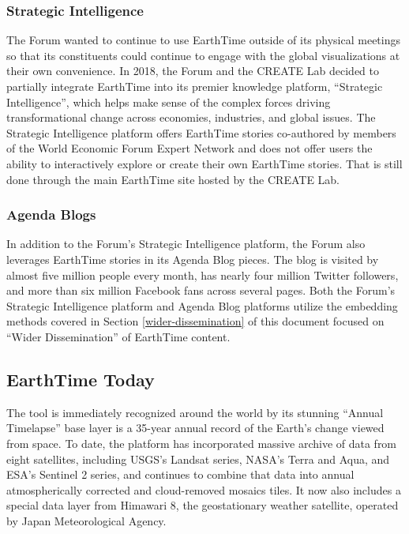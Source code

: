 \documentclass[
  12pt,
]{krantz}
\begin{document}
\hypertarget{strategic-intelligence}{%
\subsubsection*{Strategic Intelligence}\label{strategic-intelligence}}


The Forum wanted to continue to use EarthTime outside of its physical meetings so that its constituents could continue to engage with the global visualizations at their own convenience. In 2018, the Forum and the CREATE Lab decided to partially integrate EarthTime into its premier knowledge platform, ``Strategic Intelligence'', which helps make sense of the complex forces driving transformational change across economies, industries, and global issues. The Strategic Intelligence platform offers EarthTime stories co-authored by members of the World Economic Forum Expert Network and does not offer users the ability to interactively explore or create their own EarthTime stories. That is still done through the main EarthTime site hosted by the CREATE Lab.

\hypertarget{agenda-blogs}{%
\subsubsection*{Agenda Blogs}\label{agenda-blogs}}


In addition to the Forum's Strategic Intelligence platform, the Forum also leverages EarthTime stories in its Agenda Blog pieces. The blog is visited by almost five million people every month, has nearly four million Twitter followers, and more than six million Facebook fans across several pages. Both the Forum's Strategic Intelligence platform and Agenda Blog platforms utilize the embedding methods covered in Section \ref{wider-dissemination} of this document focused on ``Wider Dissemination'' of EarthTime content.

\hypertarget{earthtime-today}{%
\subsection{EarthTime Today}\label{earthtime-today}}

The tool is immediately recognized around the world by its stunning ``Annual Timelapse'' base layer is a 35-year annual record of the Earth's change viewed from space. To date, the platform has incorporated massive archive of data from eight satellites, including USGS's Landsat series, NASA's Terra and Aqua, and ESA's Sentinel 2 series, and continues to combine that data into annual atmospherically corrected and cloud-removed mosaics tiles. It now also includes a special data layer from Himawari 8, the geostationary weather satellite, operated by Japan Meteorological Agency.
\end{document}
